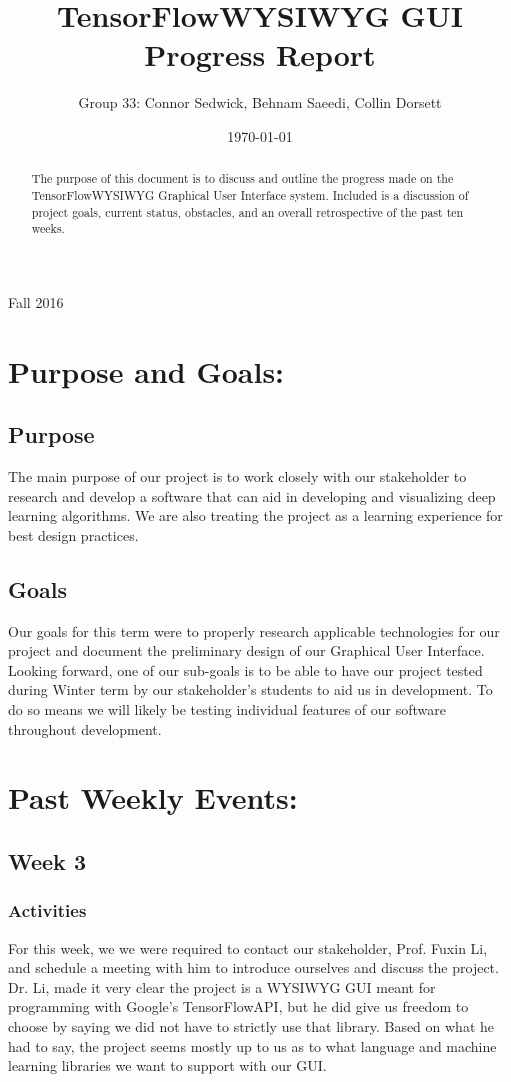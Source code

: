 \documentclass[journal,10pt,onecolumn,compsoc]{IEEEtran} \usepackage[margin=1.0in]{geometry} \usepackage{pdfpages}
\title{TensorFlow\texttrademark WYSIWYG GUI Progress Report}
\author{Group 33: Connor Sedwick, Behnam Saeedi, Collin Dorsett}
\date{\today}
\begin{document}
\maketitle
\begin{centering}
Fall 2016
\begin{abstract}
The purpose of this document is to discuss and outline the progress made on the  TensorFlow\texttrademark WYSIWYG Graphical User Interface system. 
Included is a discussion of project goals, current status, obstacles, and an overall retrospective of the past ten weeks.
\end{abstract}
\end{centering}
\newpage
\tableofcontents
\newpage
\section{Purpose and Goals:}
\subsection{Purpose}
The main purpose of our project is to work closely with our stakeholder to research and develop a software that can aid in developing and visualizing deep learning algorithms.
We are also treating the project as a learning experience for best design practices.
\subsection{Goals}
Our goals for this term were to properly research applicable technologies for our project and document the preliminary design of our Graphical User Interface.
Looking forward, one of our sub-goals is to be able to have our project tested during Winter term by our stakeholder's students to aid us in development.
To do so means we will likely be testing individual features of our software throughout development.
\newpage
\section{Past Weekly Events:}
\subsection{Week 3}
\subsubsection{Activities}
For this week, we we were required to contact our stakeholder, Prof. Fuxin Li, and schedule a meeting with him to introduce ourselves and discuss the project.
Dr. Li, made it very clear the project is a WYSIWYG GUI meant for programming with Google's TensorFlow\texttrademark API, but he did give us freedom to choose by saying we did not have to strictly use that library.
Based on what he had to say, the project seems mostly up to us as to what language and machine learning libraries we want to support with our GUI.
\end{document}
